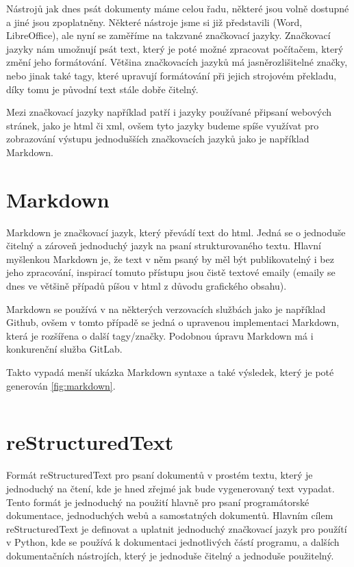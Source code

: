 Nástrojů jak dnes psát dokumenty máme celou řadu, některé jsou volně dostupné a jiné jsou zpoplatněny. Některé nástroje jsme si již představili (Word, LibreOffice), ale
nyní se zaměříme na takzvané značkovací jazyky. Značkovací jazyky nám umožnují psát text, který je poté možné zpracovat počítačem, který změní jeho formátování. Většina
značkovacích jazyků má jasně\linebreak rozlišitelné značky, nebo jinak také tagy, které upravují formátování při jejich strojovém překladu, díky tomu je původní text stále dobře čitelný.
\cite{markup}

Mezi značkovací jazyky například patří i jazyky používané při\linebreak psaní webových stránek, jako je \gls{html} či \gls{xml}, ovšem tyto jazyky budeme spíše využívat pro zobrazování výstupu
jednodušších značkovacích jazyků jako je například \mbox{Markdown}.

\clearpage

\section{Markdown}

Markdown je značkovací jazyk, který převádí text do \gls{html}. Jedná se o jednoduše čitelný a zároveň jednoduchý jazyk na psaní strukturovaného textu. Hlavní myšlenkou Markdown je, že
text v něm psaný by měl být publikovatelný i bez jeho zpracování, inspirací tomuto přístupu jsou čistě textové emaily (emaily se dnes ve většině případů píšou v \gls{html}
z důvodu grafického obsahu). \cite{markdown}

Markdown se používá v na některých verzovacích službách jako je například Github, ovšem v tomto případě se jedná o upravenou implementaci Markdown, která je rozšířena o další
tagy/značky. Podobnou úpravu Markdown má i konkurenční služba GitLab.

Takto vypadá menší ukázka Markdown syntaxe a také výsledek, který je poté generován \ref{fig:markdown}.

\inputminted[linenos,breaklines]{md}{example.md}

\clearpage

\section{reStructuredText}

Formát reStructuredText pro psaní dokumentů v prostém textu, který je jednoduchý na čtení, kde je hned zřejmé jak bude vygenerovaný text vypadat.
Tento formát je jednoduchý na použití hlavně pro psaní programátorské dokumentace, jednoduchých webů a samostatných dokumentů.
Hlavním cílem reStructuredText je definovat a uplatnit jednoduchý značkovací jazyk pro použítí v Python, kde se používá k dokumentaci jednotlivých částí programu,
a dalších dokumentačních nástrojích, který je jednoduše čitelný a jednoduše použitelný. \cite{reStruDoc}

